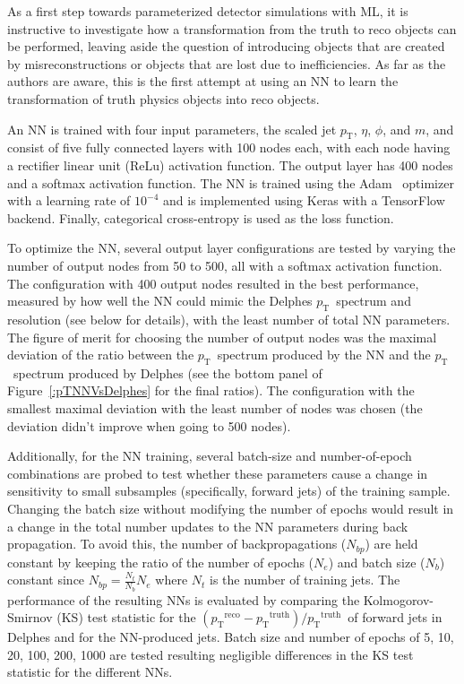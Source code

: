 \documentclass[showpacs,showkeys,preprint,prd,nofootinbib,linenumbers,12pt,superscriptaddress]{revtex4-1}
\def\pt{\ensuremath{p_{\mathrm{T}}}}
\def\ptRes{\ensuremath{(\pt^{\mathrm{reco}}-\pt^{\mathrm{truth}})/\pt^{\mathrm{truth}}}}
\begin{document}
As a first step towards parameterized detector simulations with ML, it is instructive to investigate how a transformation from the truth to reco objects can be performed, leaving aside the question of introducing objects that are created by misreconstructions or objects that are lost due to inefficiencies. As far as the authors are aware, this is the first attempt at using an NN to learn the transformation of truth physics objects into reco objects.

An NN is trained with four input parameters, the scaled jet \pt, $\eta$, $\phi$, and $m$, and consist of five fully connected layers with 100 nodes each, with each node having a rectifier linear unit (ReLu) activation function. The output layer has 400 nodes and a softmax activation function. The NN is trained using the Adam~\cite{adam} optimizer with a learning rate of $10^{-4}$ and is implemented using Keras with a TensorFlow~\cite{tensorflow2015-whitepaper} backend. Finally, categorical cross-entropy is used as the loss function.

To optimize the NN, several output layer configurations are tested by varying the number of output nodes from 50 to 500, all with a softmax activation function. The configuration with 400 output nodes resulted in the best performance, measured by how well the NN could mimic the Delphes \pt\ spectrum and resolution (see below for details), with the least number of total NN parameters. The figure of merit for choosing the number of output nodes was the maximal deviation of the ratio between the \pt\ spectrum produced by the NN and the \pt\ spectrum produced by Delphes (see the bottom panel of Figure~\ref{:pTNNVsDelphes} for the final ratios). The configuration with the smallest maximal deviation with the least number of nodes was chosen (the deviation didn't improve when going to 500 nodes).

Additionally, for the NN training, several batch-size and number-of-epoch combinations are probed to test whether these parameters cause a change in sensitivity to small subsamples (specifically, forward jets) of the training sample. Changing the batch size without modifying the number of epochs would result in a change in the total number updates to the NN parameters during back propagation. To avoid this, the number of backpropagations ($N_{bp}$) are held constant by keeping the ratio of the number of epochs ($N_e$) and batch size ($N_b$) constant since $N_{bp}=\frac{N_t}{N_b}N_e$ where $N_t$ is the number of training jets. The performance of the resulting NNs is evaluated by comparing the Kolmogorov-Smirnov (KS) test statistic for the \ptRes\ of forward jets in Delphes and for the NN-produced jets. Batch size and number of epochs of 5, 10, 20, 100, 200, 1000 are tested resulting negligible differences in the KS test statistic for the different NNs.
\end{document}
